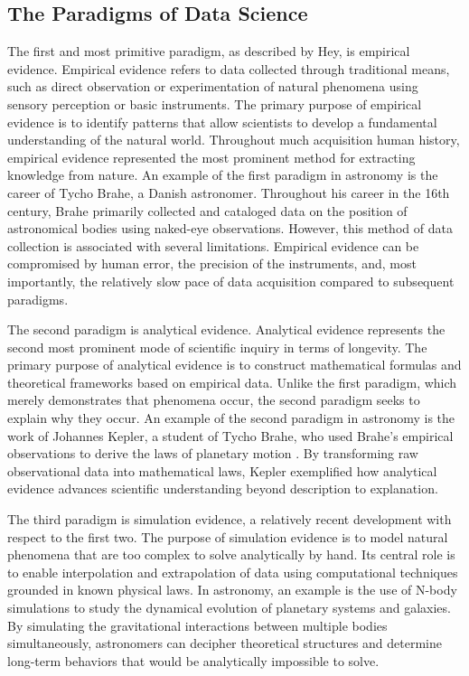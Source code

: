 \documentclass[preprint,linenumbers, longauthor]{aastex631}
\begin{document}
\subsection{The Paradigms of Data Science}
The first and most primitive paradigm, as described by Hey, is empirical evidence. 
Empirical evidence refers to data collected through traditional means, such as direct observation or experimentation of natural phenomena using sensory perception or basic instruments. 
The primary purpose of empirical evidence is to identify patterns that allow scientists to develop a fundamental understanding of the natural world. 
Throughout much acquisition human history, empirical evidence represented the most prominent method for extracting knowledge from nature. 
An example of the first paradigm in astronomy is the career of Tycho Brahe, a Danish astronomer. Throughout his career in the 16th century, Brahe primarily collected and cataloged data on the position of astronomical bodies using naked-eye observations. 
However, this method of data collection is associated with several limitations. Empirical evidence can be compromised by human error, the precision of the instruments, and, most importantly, the relatively slow pace of data acquisition compared to subsequent paradigms.

The second paradigm is analytical evidence. Analytical evidence represents the second most prominent mode of scientific inquiry in terms of longevity. 
The primary purpose of analytical evidence is to construct mathematical formulas and theoretical frameworks based on empirical data. 
Unlike the first paradigm, which merely demonstrates that phenomena occur, the second paradigm seeks to explain why they occur. 
An example of the second paradigm in astronomy is the work of Johannes Kepler, a student of Tycho Brahe, who used Brahe's empirical observations to derive the laws of planetary motion \citep{heyFourthParadigmDataIntensive2009}. 
By transforming raw observational data into mathematical laws, Kepler exemplified how analytical evidence advances scientific understanding beyond description to explanation.

The third paradigm is simulation evidence, a relatively recent development with respect to the first two. The purpose of simulation evidence is to model natural phenomena that are too complex to solve analytically by hand. 
Its central role is to enable interpolation and extrapolation of data using computational techniques grounded in known physical laws. 
In astronomy, an example is the use of N-body simulations to study the dynamical evolution of planetary systems and galaxies. 
By simulating the gravitational interactions between multiple bodies simultaneously, astronomers can decipher theoretical structures and determine long-term behaviors that would be analytically impossible to solve.
\end{document}
